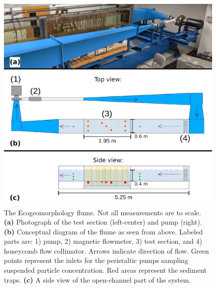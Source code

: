 \documentclass[geosciences,article,submit,moreauthors,pdftex]{Definitions/mdpi}
\begin{document}
\begin{figure}[H]
\includegraphics[width=5in]{../pics/flume_with_sedtraps.png}
\centering
\caption{The Ecogeomorphology flume. Not all measurements are to scale. \textbf{(a)} Photograph of the test section (left-center) and pump (right). \textbf{(b)} Conceptual diagram of the flume as seen from above. Labeled parts are: 1) pump, 2) magnetic flowmeter, 3) test section, and 4) honeycomb flow collimator. Arrows indicate direction of flow. Green points represent the inlets for the peristaltic pumps sampling suspended particle concentration. Red areas represent the sediment traps. \textbf{(c)} A side view of the open-channel part of the system.}
\label{fig:floorplan}
\end{figure}
\end{document}

